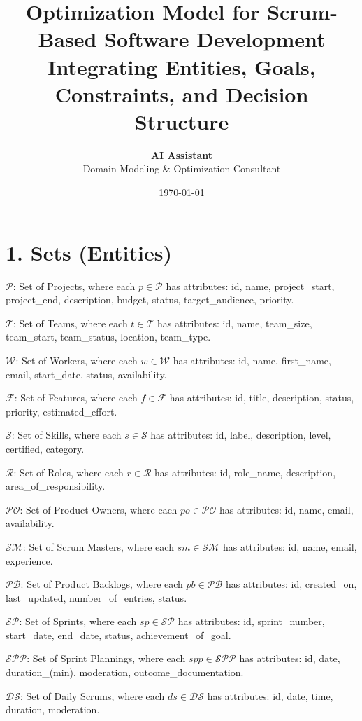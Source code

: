 \documentclass[12pt]{article}
\title{\Huge Optimization Model for Scrum-Based Software Development \\ \Large Integrating Entities, Goals, Constraints, and Decision Structure}
\author{\textbf{AI Assistant} \\ Domain Modeling & Optimization Consultant}
\date{\today}
\begin{document}
\maketitle
\tableofcontents
\newpage

\section{1. Sets (Entities)}
\item $ \mathcal{P} $: Set of Projects, where each $ p \in \mathcal{P} $ has attributes: id, name, project\_start, project\_end, description, budget, status, target\_audience, priority.
    \item $ \mathcal{T} $: Set of Teams, where each $ t \in \mathcal{T} $ has attributes: id, name, team\_size, team\_start, team\_status, location, team\_type.
    \item $ \mathcal{W} $: Set of Workers, where each $ w \in \mathcal{W} $ has attributes: id, name, first\_name, email, start\_date, status, availability.
    \item $ \mathcal{F} $: Set of Features, where each $ f \in \mathcal{F} $ has attributes: id, title, description, status, priority, estimated\_effort.
    \item $ \mathcal{S} $: Set of Skills, where each $ s \in \mathcal{S} $ has attributes: id, label, description, level, certified, category.
    \item $ \mathcal{R} $: Set of Roles, where each $ r \in \mathcal{R} $ has attributes: id, role\_name, description, area\_of\_responsibility.
    \item $ \mathcal{PO} $: Set of Product Owners, where each $ po \in \mathcal{PO} $ has attributes: id, name, email, availability.
    \item $ \mathcal{SM} $: Set of Scrum Masters, where each $ sm \in \mathcal{SM} $ has attributes: id, name, email, experience.
    \item $ \mathcal{PB} $: Set of Product Backlogs, where each $ pb \in \mathcal{PB} $ has attributes: id, created\_on, last\_updated, number\_of\_entries, status.
    \item $ \mathcal{SP} $: Set of Sprints, where each $ sp \in \mathcal{SP} $ has attributes: id, sprint\_number, start\_date, end\_date, status, achievement\_of\_goal.
    \item $ \mathcal{SPP} $: Set of Sprint Plannings, where each $ spp \in \mathcal{SPP} $ has attributes: id, date, duration\_(min), moderation, outcome\_documentation.
    \item $ \mathcal{DS} $: Set of Daily Scrums, where each $ ds \in \mathcal{DS} $ has attributes: id, date, time, duration, moderation.
\end{document}
